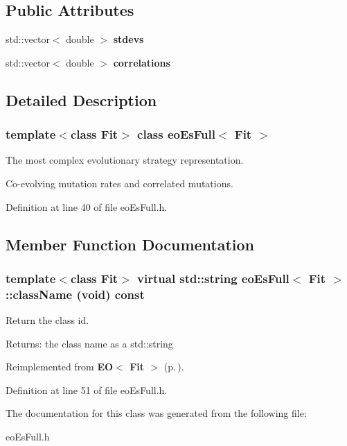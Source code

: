 \subsection*{Public Attributes}
\begin{CompactItemize}
\item 
std::vector$<$ double $>$ {\bf stdevs}\label{classeo_es_full_o0}

\item 
std::vector$<$ double $>$ {\bf correlations}\label{classeo_es_full_o1}

\end{CompactItemize}


\subsection{Detailed Description}
\subsubsection*{template$<$class Fit$>$ class eo\-Es\-Full$<$ Fit $>$}

The most complex evolutionary strategy representation. 

Co-evolving mutation rates and correlated mutations. 



Definition at line 40 of file eo\-Es\-Full.h.

\subsection{Member Function Documentation}
\subsubsection{\setlength{\rightskip}{0pt plus 5cm}template$<$class Fit$>$ virtual std::string {\bf eo\-Es\-Full}$<$ Fit $>$::class\-Name (void) const\hspace{0.3cm}{\tt  [inline, virtual]}}\label{classeo_es_full_a1}


Return the class id. 

\begin{Desc}
\item[Returns:]the class name as a std::string \end{Desc}


Reimplemented from {\bf EO$<$ Fit $>$} {\rm (p.\,\pageref{class_e_o_z10_0})}.

Definition at line 51 of file eo\-Es\-Full.h.

The documentation for this class was generated from the following file:\begin{CompactItemize}
\item 
eo\-Es\-Full.h\end{CompactItemize}
